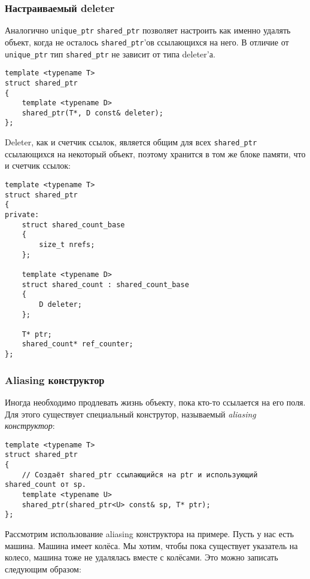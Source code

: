 \subsubsection{Настраиваемый deleter}

Аналогично \texttt{unique_ptr} \texttt{shared_ptr} позволяет настроить как именно удалять объект, когда не осталось \texttt{shared_ptr}'ов ссылающихся на него. В отличие от \texttt{unique_ptr} тип \texttt{shared_ptr} не зависит от типа deleter'а.

\begin{verbatim}
template <typename T>
struct shared_ptr
{
    template <typename D>
    shared_ptr(T*, D const& deleter);
};
\end{verbatim}

Deleter, как и счетчик ссылок, является общим для всех \texttt{shared_ptr} ссылающихся на некоторый объект, поэтому хранится в том же блоке памяти, что и счетчик ссылок:

\begin{verbatim}
template <typename T>
struct shared_ptr
{
private:
    struct shared_count_base
    {
        size_t nrefs;
    };

    template <typename D>
    struct shared_count : shared_count_base
    {
        D deleter;
    };

    T* ptr;
    shared_count* ref_counter;
};
\end{verbatim}

\subsubsection{Aliasing конструктор}
\label{aliasing_constructor}
Иногда необходимо продлевать жизнь объекту, пока кто-то ссылается на его поля. Для этого существует специальный конструтор, называемый {\it aliasing конструктор}:

\begin{verbatim}
template <typename T>
struct shared_ptr
{
    // Создаёт shared_ptr ссылающийся на ptr и использующий shared_count от sp.
    template <typename U>
    shared_ptr(shared_ptr<U> const& sp, T* ptr);
};
\end{verbatim}

Рассмотрим использование aliasing конструктора на примере. Пусть у нас есть машина. Машина имеет колёса. Мы хотим, чтобы пока существует указатель на колесо, машина тоже не удалялась вместе с колёсами. Это можно записать следующим образом:

